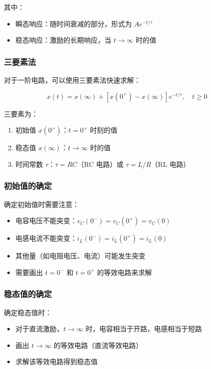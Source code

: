 其中：
\begin{itemize}
  \item 瞬态响应：随时间衰减的部分，形式为 $A e^{-t/\tau}$
  \item 稳态响应：激励的长期响应，当 $t \to \infty$ 时的值
\end{itemize}

\subsubsection{三要素法}

对于一阶电路，可以使用三要素法快速求解：

\begin{equation}
x(t) = x(\infty) + [x(0^+) - x(\infty)] e^{-t/\tau}, \quad t \geq 0 \label{eq:three-element-method}
\end{equation}

三要素为：
\begin{enumerate}
  \item 初始值 $x(0^+)$：$t=0^+$ 时刻的值
  \item 稳态值 $x(\infty)$：$t \to \infty$ 时的值
  \item 时间常数 $\tau$：$\tau = RC$（RC 电路）或 $\tau = L/R$（RL 电路）
\end{enumerate}

\subsubsection{初始值的确定}

确定初始值时需要注意：

\begin{itemize}
  \item 电容电压不能突变：$v_C(0^-) = v_C(0^+) = v_C(0)$
  \item 电感电流不能突变：$i_L(0^-) = i_L(0^+) = i_L(0)$
  \item 其他量（如电阻电压、电流）可能发生突变
  \item 需要画出 $t=0^-$ 和 $t=0^+$ 的等效电路来求解
\end{itemize}

\subsubsection{稳态值的确定}

确定稳态值时：

\begin{itemize}
  \item 对于直流激励，$t \to \infty$ 时，电容相当于开路，电感相当于短路
  \item 画出 $t \to \infty$ 的等效电路（直流等效电路）
  \item 求解该等效电路得到稳态值
\end{itemize}

